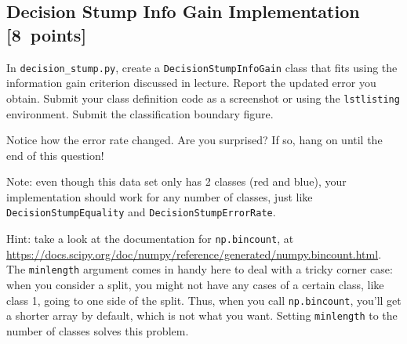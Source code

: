 \documentclass{article}
\newcommand{\blu}[1]{{\textcolor{blu}{#1}}}
\let\ask\blu
\newcommand\pts[1]{\textcolor{pointscolour}{[#1~points]}}
\begin{document}
  \subsection{Decision Stump Info Gain Implementation \pts{8}}

  In \texttt{decision\string_stump.py}, \ask{create a \texttt{DecisionStumpInfoGain} class that
  fits using the information gain criterion discussed in lecture.
  Report the updated error you obtain.
  Submit your class definition code as a screenshot or using the \texttt{lstlisting} environment.
  Submit the classification boundary figure.}

  Notice how the error rate changed. Are you surprised? If so, hang on until the end of this question!

  Note: even though this data set only has 2 classes (red and blue), your implementation should work
  for any number of classes, just like \texttt{DecisionStumpEquality} and \texttt{DecisionStumpErrorRate}.

  Hint: take a look at the documentation for \texttt{np.bincount}, at \\
  \url{https://docs.scipy.org/doc/numpy/reference/generated/numpy.bincount.html}.
  The \texttt{minlength} argument comes in handy here to deal with a tricky corner case:
  when you consider a split, you might not have any cases of a certain class, like class 1,
  going to one side of the split. Thus, when you call \texttt{np.bincount}, you'll get
  a shorter array by default, which is not what you want. Setting \texttt{minlength} to the
  number of classes solves this problem.
\end{document}
